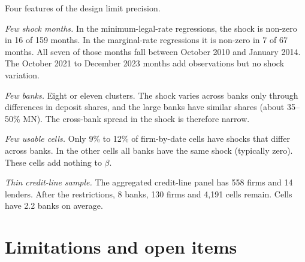 \documentclass[11pt]{article}
\renewcommand{\_}{\origunderscore\hspace{0pt}}  %
\begin{document}
Four features of the design limit precision.

\textit{Few shock months.}
In the minimum-legal-rate regressions, the shock is non-zero in 16 of 159 months.
In the marginal-rate regressions it is non-zero in 7 of 67 months.
All seven of those months fall between October 2010 and January 2014.
The October 2021 to December 2023 months add observations but no shock variation.

\textit{Few banks.}
Eight or eleven clusters.
The shock varies across banks only through differences in deposit shares, and the large banks have similar shares (about 35--50\% MN).
The cross-bank spread in the shock is therefore narrow.

\textit{Few usable cells.}
Only 9\% to 12\% of firm-by-date cells have shocks that differ across banks.
In the other cells all banks have the same shock (typically zero).
These cells add nothing to $\beta$.

\textit{Thin credit-line sample.}
The aggregated credit-line panel has 558 firms and 14 lenders.
After the restrictions, 8 banks, 130 firms and 4,191 cells remain.
Cells have 2.2 banks on average.

\section{Limitations and open items}
\label{sec:limitations}
\end{document}
